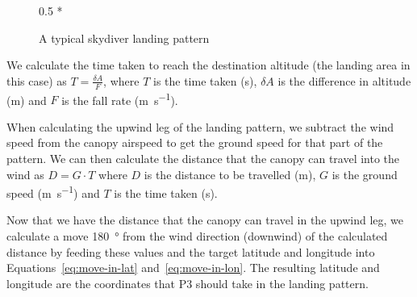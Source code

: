 \begin{figure}[ht]
  \centering
  \begin{scaletikzpicturetowidth}{0.5 * \linewidth}
  \end{scaletikzpicturetowidth}
  \caption{A typical skydiver landing pattern}\label{fig:pattern-generation}
\end{figure}

We calculate the time taken to reach the destination altitude (the landing area in this case) as $T = \frac{\delta A}{F}$, where $T$ is the time taken (\si{\second}), $\delta A$ is the difference in altitude (\si{\metre}) and $F$ is the fall rate (\si{\metre\per\second}).

When calculating the upwind leg of the landing pattern, we subtract the wind speed from the canopy airspeed to get the ground speed for that part of the pattern. We can then calculate the distance that the canopy can travel into the wind as $D = G \cdot T$ where $D$ is the distance to be travelled (\si{\metre}), $G$ is the ground speed (\si{\metre\per\second}) and $T$ is the time taken (\si{\second}).

Now that we have the distance that the canopy can travel in the upwind leg, we calculate a move \SI{180}{\degree} from the wind direction (downwind) of the calculated distance by feeding these values and the target latitude and longitude into Equations~\ref{eq:move-in-lat} and~\ref{eq:move-in-lon}. The resulting latitude and longitude are the coordinates that P3 should take in the landing pattern.

